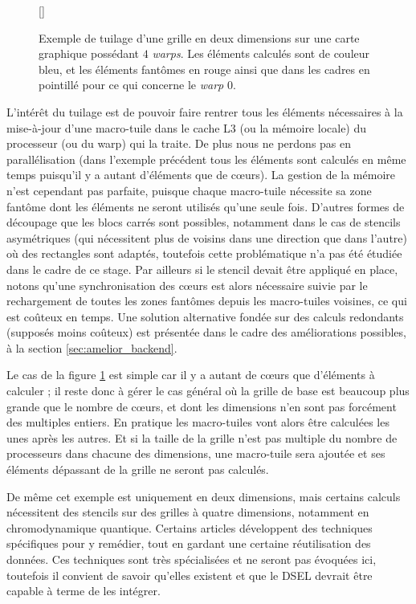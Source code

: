 \begin{figure}[!h]
[\FBwidth]
{\caption{Exemple de tuilage d'une grille en deux dimensions sur une carte graphique possédant $4$ \emph{warps}. Les éléments calculés sont de couleur bleu, et les éléments fantômes en rouge ainsi que dans les cadres en pointillé pour ce qui concerne le \emph{warp} $0$.}\label{fig:stencil_mtile}}
{}
\end{figure}

L'intérêt du tuilage est de pouvoir faire rentrer tous les éléments nécessaires à la mise-à-jour d'une macro-tuile dans le cache L3 (ou la mémoire locale) du processeur (ou du warp) qui la traite. De plus nous ne perdons pas en parallélisation (dans l'exemple précédent tous les éléments sont calculés en même temps puisqu'il y a autant d'éléments que de cœurs). La gestion de la mémoire n'est cependant pas parfaite, puisque chaque macro-tuile nécessite sa zone fantôme dont les éléments ne seront utilisés qu'une seule fois. D'autres formes de découpage que les blocs carrés sont possibles, notamment dans le cas de stencils asymétriques (qui nécessitent plus de voisins dans une direction que dans l'autre) où des rectangles sont adaptés, toutefois cette problématique n'a pas été étudiée dans le cadre de ce stage. Par ailleurs si le stencil devait être appliqué en place, notons qu'une synchronisation des cœurs est alors nécessaire suivie par le rechargement de toutes les zones fantômes depuis les macro-tuiles voisines, ce qui est coûteux en temps. Une solution alternative fondée sur des calculs redondants (supposés moins coûteux) est présentée dans le cadre des améliorations possibles, à la section \ref{sec:amelior_backend}.

Le cas de la figure \ref{fig:stencil_mtile} est simple car il y a autant de cœurs que d'éléments à calculer ; il reste donc à gérer le cas général où la grille de base est beaucoup plus grande que le nombre de cœurs, et dont les dimensions n'en sont pas forcément des multiples entiers. En pratique les macro-tuiles vont alors être calculées les unes après les autres. Et si la taille de la grille n'est pas multiple du nombre de processeurs dans chacune des dimensions, une macro-tuile sera ajoutée et ses éléments dépassant de la grille ne seront pas calculés. 

De même cet exemple est uniquement en deux dimensions, mais certains calculs nécessitent des stencils sur des grilles à quatre dimensions, notamment en chromodynamique quantique. Certains articles \cite{Art1,Art11} développent des techniques spécifiques pour y remédier, tout en gardant une certaine réutilisation des données. Ces techniques sont très spécialisées et ne seront pas évoquées ici, toutefois il convient de savoir qu'elles existent et que le DSEL devrait être capable à terme de les intégrer.

